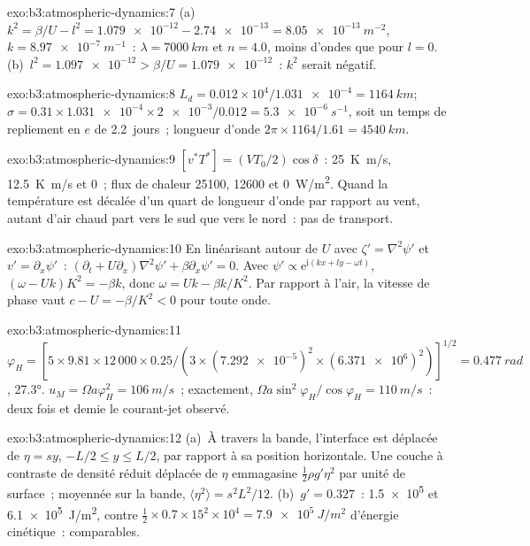 \begin{solution}{exo:b3:atmospheric-dynamics:7}
(a)~$k^2 = \beta/U - l^2 = \num{1.079e-12} - \num{2.74e-13} =
\qty{8.05e-13}{m^{-2}}$, $k = \qty{8.97e-7}{m^{-1}}$~: $\lambda =
\qty{7000}{km}$ et $n = 4.0$, moins d'ondes que pour $l = 0$. (b)~$l^2 =
\num{1.097e-12} > \beta/U = \num{1.079e-12}$~: $k^2$ serait négatif.
\end{solution}

\begin{solution}{exo:b3:atmospheric-dynamics:8}
$L_d = 0.012\times10^4/\num{1.031e-4} = \qty{1164}{km}$; $\sigma =
0.31\times\num{1.031e-4}\times\num{2e-3}/0.012 = \qty{5.3e-6}{s^{-1}}$, soit
un temps de repliement en $e$ de \num{2.2}~jours~; longueur d'onde $2\pi\times1164/1.61 =
\qty{4540}{km}$.
\end{solution}

\begin{solution}{exo:b3:atmospheric-dynamics:9}
$[v^*T^*] = (VT_0/2)\cos\delta$~: \qty{25}{K.m/s}, \qty{12.5}{K.m/s} et 0~;
flux de chaleur \num{25100}, \num{12600} et \qty{0}{W/m^2}. Quand la
température est décalée d'un quart de longueur d'onde par rapport au vent, autant
d'air chaud part vers le sud que vers le nord~: pas de transport.
\end{solution}

\begin{solution}{exo:b3:atmospheric-dynamics:10}
En linéarisant autour de $U$ avec $\zeta' = \nabla^2\psi'$ et $v' =
\partial_x\psi'$~: $(\partial_t + U\partial_x)\nabla^2\psi' + \beta\partial_x
\psi' = 0$. Avec $\psi' \propto \mathrm e^{\mathrm i(kx + ly - \omega t)}$,
$(\omega - Uk)K^2 = -\beta k$, donc $\omega = Uk - \beta k/K^2$. Par rapport à
l'air, la vitesse de phase vaut $c - U = -\beta/K^2 < 0$ pour toute onde.
\end{solution}

\begin{solution}{exo:b3:atmospheric-dynamics:11}
$\varphi_H = [5\times9.81\times12\,000\times0.25/(3\times(\num{7.292e-5})^2
\times(\num{6.371e6})^2)]^{1/2} = \qty{0.477}{rad}$, \ang{27.3}.
$u_M = \Omega a\varphi_H^2 = \qty{106}{m/s}$~; exactement, $\Omega a\sin^2
\varphi_H/\cos\varphi_H = \qty{110}{m/s}$~: deux fois et demie le
courant-jet observé.
\end{solution}

\begin{solution}{exo:b3:atmospheric-dynamics:12}
(a)~À travers la bande, l'interface est déplacée de $\eta = sy$, $-L/2 \le y
\le L/2$, par rapport à sa position horizontale. Une couche à contraste de densité réduit
déplacée de $\eta$ emmagasine $\tfrac12\rho g'\eta^2$ par unité de surface~; moyennée
sur la bande, $\langle\eta^2\rangle = s^2L^2/12$. (b)~$g' = 0.327$~:
\num{1.5e5} et \qty{6.1e5}{J/m^2}, contre $\tfrac12\times0.7\times15^2
\times10^4 = \qty{7.9e5}{J/m^2}$ d'énergie cinétique~: comparables.
\end{solution}

